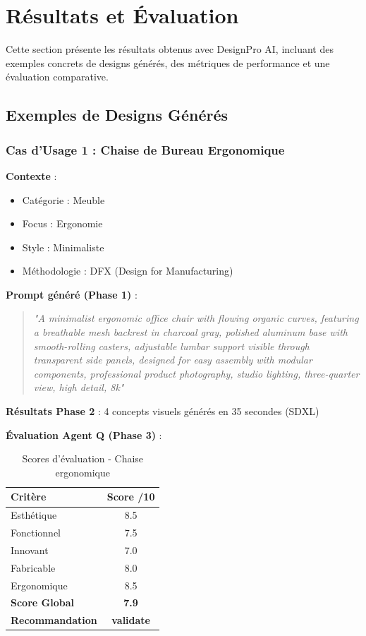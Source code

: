 \section{Résultats et Évaluation}

Cette section présente les résultats obtenus avec DesignPro AI, incluant des exemples concrets de designs générés, des métriques de performance et une évaluation comparative.

\subsection{Exemples de Designs Générés}

\subsubsection{Cas d'Usage 1 : Chaise de Bureau Ergonomique}

\textbf{Contexte} :
\begin{itemize}[leftmargin=*]
    \item Catégorie : Meuble
    \item Focus : Ergonomie
    \item Style : Minimaliste
    \item Méthodologie : DFX (Design for Manufacturing)
\end{itemize}

\textbf{Prompt généré (Phase 1)} :

\begin{quote}
\textit{"A minimalist ergonomic office chair with flowing organic curves, featuring a breathable mesh backrest in charcoal gray, polished aluminum base with smooth-rolling casters, adjustable lumbar support visible through transparent side panels, designed for easy assembly with modular components, professional product photography, studio lighting, three-quarter view, high detail, 8k"}
\end{quote}

\textbf{Résultats Phase 2} : 4 concepts visuels générés en 35 secondes (SDXL)

\textbf{Évaluation Agent Q (Phase 3)} :

\begin{table}[H]
\centering
\caption{Scores d'évaluation - Chaise ergonomique}
\label{tab:eval_chair}
\begin{tabular}{@{}lc@{}}
\toprule
\textbf{Critère} & \textbf{Score /10} \\ 
\midrule
Esthétique & 8.5 \\
Fonctionnel & 7.5 \\
Innovant & 7.0 \\
Fabricable & 8.0 \\
Ergonomique & 8.5 \\
\midrule
\textbf{Score Global} & \textbf{7.9} \\
\textbf{Recommandation} & \textbf{validate} \\
\bottomrule
\end{tabular}
\end{table}

